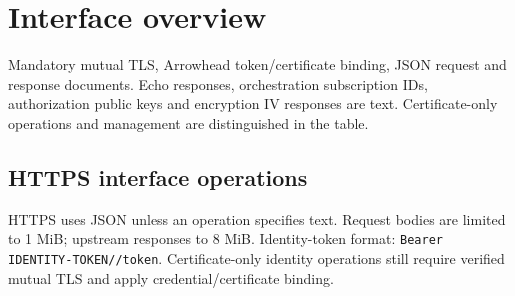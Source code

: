 \documentclass[a4paper]{arrowhead}
\begin{document}
\ArrowheadSetup
\section{Interface overview}
Mandatory mutual TLS, Arrowhead token/certificate binding, JSON request and response documents. Echo responses, orchestration subscription IDs, authorization public keys and encryption IV responses are text. Certificate-only operations and management are distinguished in the table.
\subsection{HTTPS interface operations}
HTTPS uses JSON unless an operation specifies text. Request bodies are limited to 1 MiB; upstream responses to 8 MiB. Identity-token format: \texttt{Bearer IDENTITY-TOKEN//token}. Certificate-only identity operations still require verified mutual TLS and apply credential/certificate binding.
\end{document}
